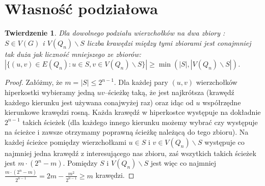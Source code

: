 \documentclass{pracamgr}
\newtheorem{theorem}{Twierdzenie}[chapter]
\begin{document}
  \section{Własność podziałowa}
   \begin{theorem}\label{wlasnosc podzialowa}
    Dla dowolnego podziału wierzchołków na dwa zbiory : $S\in V(G)$ i $V(Q_n)\backslash S$
    liczba krawędzi między tymi zbiorami jest conajmniej tak duża jak liczność mniejszego ze zbiorów:
    $|\{(u,v)\in E(Q_n):u\in S,v\in V(Q_n)\backslash S\}|\ge\min(|S|,|V(Q_n)\backslash S|)$.
   \end{theorem}
   \begin{proof}
    Załóżmy, że $m=|S|\le 2^{n-1}$.\newline
    Dla każdej pary $(u,v)$ wierzchołków hiperkostki wybieramy jedną $uv$--ścieżkę taką, że jest najkrótsza
    (krawędź każdego kierunku jest używana conajwyżej raz) oraz idąc od $u$ współrzędne kierunkowe krawędzi rosną.
    Każda krawędź w hiperkostce występuje na dokładnie $2^{n-1}$ takich ścieżek
    (dla każdego innego kierunku możemy wybrać czy występuje na ścieżce i zawsze otrzymamy poprawną ścieżkę należącą do tego zbioru).
    Na każdej ścieżce pomiędzy wierzchołkami $u\in S$ i $v\in V(Q_n)\backslash S$ występuje co najmniej jedna krawędź z interesującego nas zbioru,
    zaś wszytkich takich ścieżek jest $m\cdot(2^n-m)$. Pomiędzy $S$ i $V(Q_n)\backslash S$ jest więc co najmniej
    $\frac{m\cdot(2^n-m)}{2^{n-1}}=2m-\frac{m^2}{2^{n-1}}\ge m$ krawędzi. 
   \end{proof}
\end{document}
